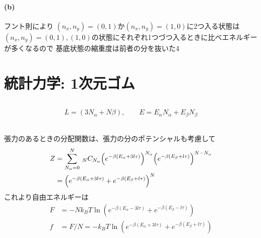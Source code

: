 \documentclass[../../master.tex]{subfiles}
\begin{document}
\subsubsection{(b)}
フント則により
\((n_x,n_y)=(0,1)\)か\((n_x,n_y)=(1,0)\)に2つ入る状態は
\((n_x,n_y)=(0,1),(1,0)\)の状態にそれぞれ1つづつ入るときに比べエネルギーが多くなるので
基底状態の縮重度は前者の分を抜いた4

\chapter{統計力学: 1次元ゴム}
\section{}
\begin{align}
    L=(3N_\alpha+N\beta),\qquad E = E_\alpha N_\alpha+ E_\beta N_\beta
\end{align}
\section{}
張力のあるときの分配関数は、張力の分のポテンシャルも考慮して
\begin{align}
    Z
    &= \sum_{N_\alpha=0}^{N} \,_NC_{N_\alpha} \qty(e^{-\beta(E_\alpha+3l\tau)})^{N_\alpha}\qty(e^{-\beta(E_\beta+l\tau)})^{N-N_\alpha}\\
    &= \qty(e^{-\beta(E_\alpha+3l\tau)}+e^{-\beta(E_\beta+l\tau)})^N
\end{align}
これより自由エネルギーは
\begin{align}
    F &= -Nk_B T \ln(e^{-\beta(E_\alpha-3l\tau)}+e^{-\beta(E_\beta-l\tau)})\\
    f &= F/N = -k_B T \ln(e^{-\beta(E_\alpha+3l\tau)}+e^{-\beta(E_\beta+l\tau)})\\
\end{align}
\end{document}
